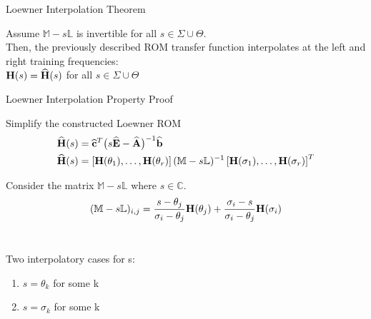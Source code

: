 
\begin{frame}{Loewner Interpolation Theorem}

\begin{theorem}
Assume $\mathbb{M}-s\mathbb{L}$ is invertible for all $s \in \Sigma \cup \Theta$.\\
\bigskip
Then, the previously described ROM transfer function interpolates at the left and right training frequencies:\\
\bigskip
${\bf H}(s) = {\bf \widehat H}(s)$ for all $s \in \Sigma \cup \Theta$
\end{theorem}

\end{frame}
\begin{frame}{Loewner Interpolation Property Proof}

Simplify the constructed Loewner ROM 
\begin{align*}
{\bf \widehat{H}}(s) & = {\bf \widehat{c}}^T \big( s{\bf \widehat{E}}-{\bf \widehat{A}} \big)^{-1} {\bf \widehat{b}} \\
{\bf \widehat{H}}(s) &= \left[{\bf H}(\theta_1), \dots, {\bf H}(\theta_r) \right](\mathbb{M} - s \mathbb{L})^{-1} \left[{\bf H}(\sigma_1), \dots, {\bf H}(\sigma_r) \right]^T
\end{align*}

Consider the matrix $\mathbb{M} - s \mathbb{L}$ where $s \in \mathbb{C}$.\\
\bigskip
$$(\mathbb{M} - s \mathbb{L})_{i,j} = \frac{s - \theta_j}{\sigma_i - \theta_j}{\bf H}(\theta_j) + \frac{\sigma_i - s}{\sigma_i - \theta_j}{\bf H}(\sigma_i)$$\\

\bigskip

Two interpolatory cases for s:

\begin{enumerate}
    \item $s = \theta_k$ for some k
    \item $s = \sigma_k$ for some k
\end{enumerate}

\end{frame}

